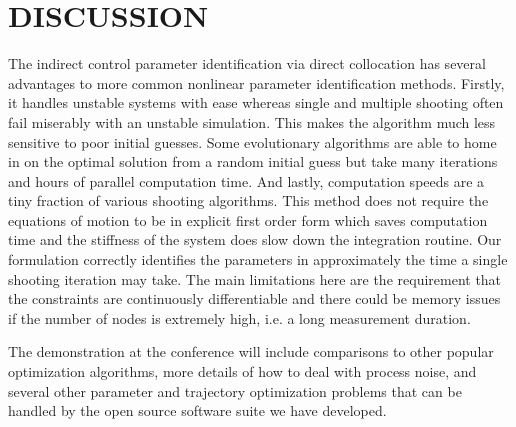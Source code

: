 \documentclass[11pt,a4paper,twocolumn]{article}
\begin{document}
\section*{DISCUSSION}

The indirect control parameter identification via direct collocation has
several advantages to more common nonlinear parameter identification methods.
Firstly, it handles unstable systems with ease whereas single and multiple
shooting often fail miserably with an unstable simulation. This makes the
algorithm much less sensitive to poor initial guesses. Some evolutionary
algorithms are able to home in on the optimal solution from a random initial
guess but take many iterations and hours of parallel computation time.  And
lastly, computation speeds are a tiny fraction of various shooting algorithms.
This method does not require the equations of motion to be in explicit first
order form which saves computation time and the stiffness of the system does
slow down the integration routine. Our formulation correctly identifies the
parameters in approximately the time a single shooting iteration may take. The
main limitations here are the requirement that the constraints are continuously
differentiable and there could be memory issues if the number of nodes is
extremely high, i.e. a long measurement duration.

The demonstration at the conference will include comparisons to other popular
optimization algorithms, more details of how to deal with process noise, and
several other parameter and trajectory optimization problems that can be
handled by the open source software suite we have developed.



\end{document}

